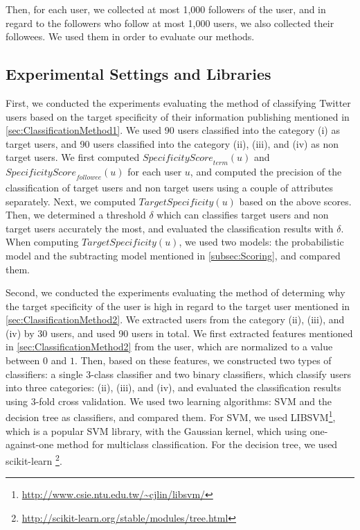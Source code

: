 Then, for each user, we collected at most 1,000 followers of the user,
and in regard to the followers who follow at most 1,000 users, we also
collected their followees.  We used them in order to evaluate our
methods.

\subsection{Experimental Settings and Libraries}
\label{subsec:Settings}

First, we conducted the experiments evaluating the method of classifying
Twitter users based on the target specificity of their information
publishing mentioned in \ref{sec:ClassificationMethod1}.  We used 90
users classified into the category (i) as target users, and 90 users
classified into the category (ii), (iii), and (iv) as non target users.
We first computed $\mathit{SpecificityScore}_{{\mathit{term}}}(u)$ and
$\mathit{SpecificityScore}_{{\mathit{followee}}}(u)$ for each user $u$,
and computed the precision of the classification of target users and non
target users using a couple of attributes separately.  Next, we computed
$\mathit{TargetSpecificity}(u)$ based on the above scores.  Then, we
determined a threshold $\delta$ which can classifies target users and
non target users accurately the most, and evaluated the classification
results with $\delta$.  When computing $\mathit{TargetSpecificity}(u)$,
we used two models: the probabilistic model and the subtracting model
mentioned in \ref{subsec:Scoring}, and compared them.

Second, we conducted the experiments evaluating the method of determing
why the target specificity of the user is high in regard to the target
user mentioned in \ref{sec:ClassificationMethod2}.  We extracted users
from the category (ii), (iii), and (iv) by 30 users, and used 90 users
in total.  We first extracted features mentioned in
\ref{sec:ClassificationMethod2} from the user, which are normalized to a
value between $0$ and $1$.  Then, based on these features, we
constructed two types of classifiers: a single 3-class classifier and
two binary classifiers, which classify users into three categories:
(ii), (iii), and (iv), and evaluated the classification results using
3-fold cross validation.  We used two learning algorithms: SVM and the
decision tree as classifiers, and compared them.  For SVM, we used
LIBSVM\footnote{\url{http://www.csie.ntu.edu.tw/~cjlin/libsvm/}}, which
is a popular SVM library, with the Gaussian kernel, which using
one-against-one method for multiclass classification.  For the decision
tree, we used scikit-learn
\footnote{\url{http://scikit-learn.org/stable/modules/tree.html}}.

